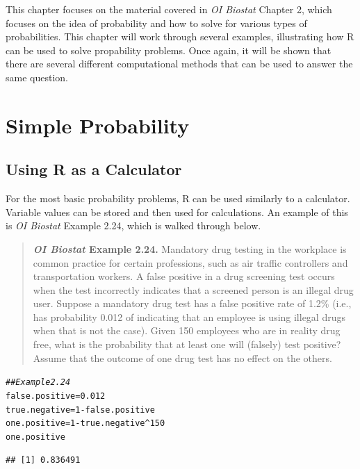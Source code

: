 \documentclass{report}\usepackage[]{graphicx}\usepackage[]{color}
\makeatletter
\newcommand{\hlnum}[1]{\textcolor[rgb]{0.686,0.059,0.569}{#1}}%
\newcommand{\hlcom}[1]{\textcolor[rgb]{0.678,0.584,0.686}{\textit{#1}}}%
\newcommand{\hlopt}[1]{\textcolor[rgb]{0,0,0}{#1}}%
\newcommand{\hlstd}[1]{\textcolor[rgb]{0.345,0.345,0.345}{#1}}%
\newcommand{\hlkwb}[1]{\textcolor[rgb]{0.69,0.353,0.396}{#1}}%
\newenvironment{kframe}{%
 \def\at@end@of@kframe{}%
 \ifinner\ifhmode%
  \def\at@end@of@kframe{\end{minipage}}%
  \begin{minipage}{\columnwidth}%
 \fi\fi%
 \def\FrameCommand##1{\hskip\@totalleftmargin \hskip-\fboxsep
 \colorbox{shadecolor}{##1}\hskip-\fboxsep
     \hskip-\linewidth \hskip-\@totalleftmargin \hskip\columnwidth}%
 \MakeFramed {\advance\hsize-\width
   \@totalleftmargin\z@ \linewidth\hsize
   \@setminipage}}%
 {\par\unskip\endMakeFramed%
 \at@end@of@kframe}
\newenvironment{knitrout}{}{} %
\makeatother
\begin{document}
\pagestyle{fancy}

\vspace{0.5cm}

This chapter focuses on the material covered in \textit{OI Biostat} Chapter 2, which focuses on the idea of probability and how to solve for various types of probabilities. This chapter will work through several examples, illustrating how \textsf{R} can be used to solve propability problems.  Once again, it will be shown that there are several different computational methods that can be used to answer the same question.  

\section{Simple Probability}

\subsection{Using R as a Calculator}
For the most basic probability problems, \textsf{R} can be used similarly to a calculator.  Variable values can be stored and then used for calculations.  An example of this is \textit{OI Biostat} Example 2.24, which is walked through below.   

\begin{quotation}
\textbf{\textit{OI Biostat} Example 2.24.}  Mandatory drug testing in the workplace is common practice for certain professions, such as air traffic controllers and transportation workers.  A false positive in a drug screening test occurs when the test incorrectly indicates that a screened person is an illegal drug user. Suppose a mandatory drug test has a false positive rate of 1.2\% (i.e., has probability  0.012 of indicating that an employee is using illegal drugs when that is not the case).  Given 150 employees who are in reality drug free, what is the probability that at least one will (falsely) test positive? Assume that the outcome of one drug test has no effect on the others.
\end{quotation}

\begin{knitrout}
\color{fgcolor}\begin{kframe}
\begin{alltt}
\hlcom{## Example 2.24}
\hlstd{false.positive} \hlkwb{=} \hlnum{0.012}
\hlstd{true.negative} \hlkwb{=} \hlnum{1}\hlopt{-}\hlstd{false.positive}
\hlstd{one.positive} \hlkwb{=} \hlnum{1}\hlopt{-}\hlstd{true.negative}\hlopt{^}\hlnum{150}
\hlstd{one.positive}
\end{alltt}
\begin{verbatim}
## [1] 0.836491
\end{verbatim}
\end{kframe}
\end{knitrout}
\end{document}
